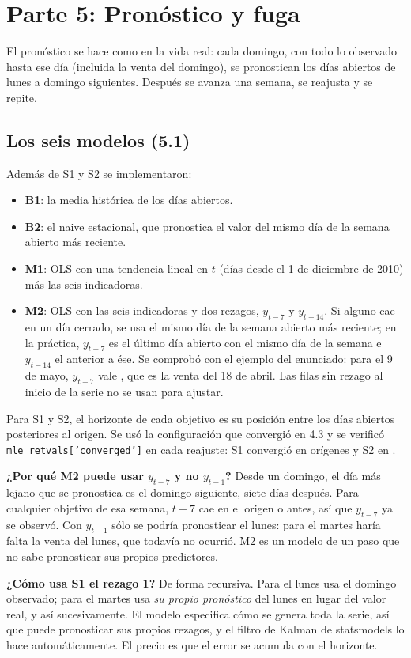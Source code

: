 \documentclass[11pt,letterpaper]{article}
\newcommand{\code}[1]{\texttt{#1}}
\newenvironment{respuesta}{\par\medskip}{\par\medskip}
\begin{document}
\section{Parte 5: Pronóstico y fuga}

El pronóstico se hace como en la vida real: cada domingo, con todo lo
observado hasta ese día (incluida la venta del domingo), se pronostican los
días abiertos de lunes a domingo siguientes. Después se avanza una semana, se
reajusta y se repite.

\subsection{Los seis modelos (5.1)}

Además de S1 y S2 se implementaron:
\begin{itemize}[leftmargin=1.2em]
\item \textbf{B1}: la media histórica de los días abiertos.
\item \textbf{B2}: el naive estacional, que pronostica el valor del mismo día
de la semana abierto más reciente.
\item \textbf{M1}: OLS con una tendencia lineal en $t$ (días desde el 1 de
diciembre de 2010) más las seis indicadoras.
\item \textbf{M2}: OLS con las seis indicadoras y dos rezagos, $y_{t-7}$ y
$y_{t-14}$. Si alguno cae en un día cerrado, se usa el mismo día de la
semana abierto más reciente; en la práctica, $y_{t-7}$ es el último día
abierto con el mismo día de la semana e $y_{t-14}$ el anterior a ése. Se
comprobó con el ejemplo del enunciado: para el 9 de mayo, $y_{t-7}$ vale
\LagMayo, que es la venta del 18 de abril. Las filas sin rezago al inicio de
la serie no se usan para ajustar.
\end{itemize}
Para S1 y S2, el horizonte de cada objetivo es su posición entre los días
abiertos posteriores al origen. Se usó la configuración que convergió en 4.3
y se verificó \code{mle\_retvals['converged']} en cada reajuste: S1 convergió
en \ConvSuno{} orígenes y S2 en \ConvSdos.

\begin{respuesta}
\textbf{¿Por qué M2 puede usar $y_{t-7}$ y no $y_{t-1}$?} Desde un domingo,
el día más lejano que se pronostica es el domingo siguiente, siete días
después. Para cualquier objetivo de esa semana, $t-7$ cae en el origen o
antes, así que $y_{t-7}$ ya se observó. Con $y_{t-1}$ sólo se podría
pronosticar el lunes: para el martes haría falta la venta del lunes, que
todavía no ocurrió. M2 es un modelo de un paso que no sabe pronosticar sus
propios predictores.

\textbf{¿Cómo usa S1 el rezago 1?} De forma recursiva. Para el lunes usa el
domingo observado; para el martes usa \emph{su propio pronóstico} del lunes
en lugar del valor real, y así sucesivamente. El modelo especifica cómo se
genera toda la serie, así que puede pronosticar sus propios rezagos, y el
filtro de Kalman de statsmodels lo hace automáticamente. El precio es que el
error se acumula con el horizonte.
\end{respuesta}
\end{document}
